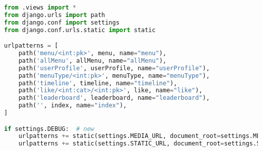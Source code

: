 \begin{lstlisting}[language=Python]
from .views import *
from django.urls import path
from django.conf import settings
from django.conf.urls.static import static

urlpatterns = [
    path('menu/<int:pk>', menu, name="menu"),
    path('allMenu', allMenu, name="allMenu"),
    path('userProfile', userProfile, name="userProfile"),
    path('menuType/<int:pk>', menuType, name="menuType"),
    path('timeline', timeline, name="timeline"),
    path('like/<int:cat>/<int:pk>', like, name="like"),
    path('leaderboard', leaderboard, name="leaderboard"),
    path('', index, name="index"),
]

if settings.DEBUG:  # new
    urlpatterns += static(settings.MEDIA_URL, document_root=settings.MEDIA_ROOT)
    urlpatterns += static(settings.STATIC_URL, document_root=settings.STATIC_ROOT)
    
\end{lstlisting}